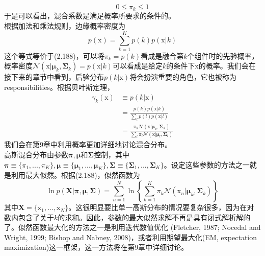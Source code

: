 \documentclass[b5paper]{book}
\numberwithin{equation}{chapter}
\newcommand {\bx} {\boldsymbol{\mathrm{x}}}
\newcommand {\bfMu} {\boldsymbol{\mu}}
\newcommand {\bfSigma} {\boldsymbol{\Sigma}}
\begin{document}
{	\begin{equation}
		0 \leqslant \pi_k \leqslant 1
	\end{equation}
	于是可以看出，混合系数是满足概率所要求的条件的。\\
	\indent 根据加法和乘法规则，边缘概率密度为
	\begin{equation}
		p(\bx) = \sum_{k=1}^K p(k)p(\bx|k)
	\end{equation}
	这个等式等价于(2.188)，可以将$\pi_k=p(k)$看成是融合第$k$个组件时的先验概率，概率密度$\mathcal{N}(\bx|\bfMu_k, \bfSigma_k)=p(\bx|k)$可以看成是给定$k$的条件下$\bx$的概率。我们会在接下来的章节中看到，后验分布$p(k|\bx)$将会扮演重要的角色，它也被称为responsibilities。根据贝叶斯定理，
	\begin{equation}
	\begin{split}
		\gamma_k(\bx) &\equiv p(k|\bx) \\
		&= \frac{p(k)p(\bx|k)}{\sum_lp(l)p(\bx|l)} \\
		&= \frac{\pi_k\mathcal{N}(\bx|\bfMu_k,\bfSigma_k)}{\sum_l \pi_l \mathcal{N}(\bx|\bfMu_l, \bfSigma_l)}
	\end{split}
	\end{equation}
	我们会在第9章中利用概率更加详细地讨论混合分布。\\
	\indent 高斯混合分布由参数$\boldsymbol{\pi}, \bfMu$和$\bfSigma$控制，其中$\boldsymbol{\pi} \equiv \{\pi_1,...,\pi_K\}, \bfMu \equiv \{\bfMu_1,...,\bfMu_K\}, \bfSigma \equiv \{\bfSigma_1,...,\bfSigma_K\}$。设定这些参数的方法之一就是利用最大似然。根据(2.188)，似然函数为
	\begin{equation}
		\ln p(\mathbf{X}|\boldsymbol{\pi},\bfMu,\bfSigma)=\sum_{n=1}^N \ln \left\{\sum_{k=1}^K \pi_k \mathcal{N}(\bx_n|\bfMu_k, \bfSigma_k)\right\}
	\end{equation}
	其中$\mathbf{X}=\{\bx_1,...,\bx_N\}$。这很明显要比单一高斯分布的情况要复杂很多，因为在对数内包含了关于$k$的求和。因此，参数的最大似然求解不再是具有闭式解析解的了。似然函数最大化的方法之一是利用迭代数值优化 (Fletcher, 1987; Nocedal and Wright, 1999; Bishop and Nabney, 2008)，或者利用期望最大化(EM, expectation maximization)这一框架，这一方法将在第9章中详细讨论。
	}
\end{document}
